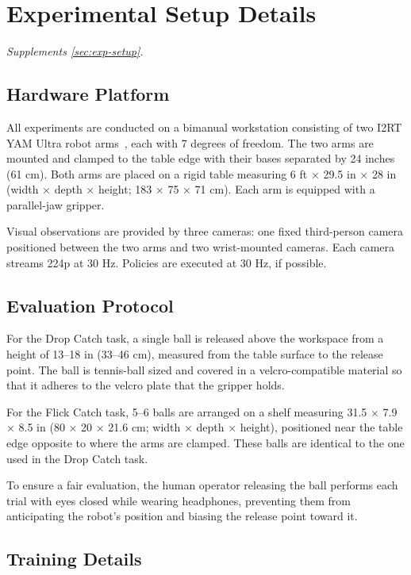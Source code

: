 \section{Experimental Setup Details}
\label{app:setup}

\emph{Supplements \cref{sec:exp-setup}.}

\subsection{Hardware Platform}
All experiments are conducted on a bimanual workstation consisting of two I2RT YAM Ultra robot arms~\cite{i2rt_yam_ultra}, each with 7 degrees of freedom. The two arms are mounted and clamped to the table edge with their bases separated by 24 inches (61 cm). Both arms are placed on a rigid table measuring 6 ft × 29.5 in × 28 in (width × depth × height; 183 × 75 × 71 cm). Each arm is equipped with a parallel-jaw gripper.

 Visual observations are provided by three cameras: one fixed third-person camera positioned between the two arms and two wrist-mounted cameras. Each camera streams 224p at 30 Hz. Policies are executed at 30 Hz, if possible.

\subsection{Evaluation Protocol}

For the Drop Catch task, a single ball is released above the workspace from a height of 13–18 in (33–46 cm), measured from the table surface to the release point. The ball is tennis-ball sized and covered in a velcro-compatible material so that it adheres to the velcro plate that the gripper holds.

For the Flick Catch task, 5–6 balls are arranged on a shelf measuring 31.5 × 7.9 × 8.5 in (80 × 20 × 21.6 cm; width × depth × height), positioned near the table edge opposite to where the arms are clamped. These balls are identical to the one used in the Drop Catch task.

To ensure a fair evaluation, the human operator releasing the ball performs each trial with eyes closed while wearing headphones, preventing them from anticipating the robot's position and biasing the release point toward it.

\subsection{Training Details}

